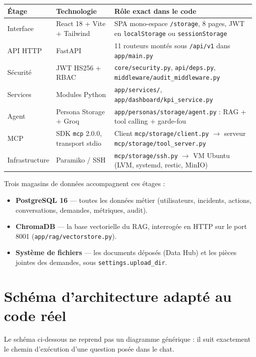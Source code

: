 \documentclass[11pt,a4paper]{report}
\newcommand{\file}[1]{\texttt{\small #1}}
\newcommand{\route}[1]{\texttt{\small\textcolor{oasisgreen}{#1}}}
\newcommand{\arrowto}{\ensuremath{\rightarrow}}
\begin{document}
\begin{longtable}{@{}p{2.6cm}p{4.3cm}p{7.6cm}@{}}
\toprule
\textbf{Étage} & \textbf{Technologie} & \textbf{Rôle exact dans le code}\\
\midrule
\endhead
Interface & React 18 + Vite + Tailwind & SPA mono-espace \file{/storage}, 8 pages, JWT en \texttt{localStorage} ou \texttt{sessionStorage}\\
API HTTP & FastAPI & 11 routeurs montés sous \route{/api/v1} dans \file{app/main.py}\\
Sécurité & JWT HS256 + RBAC & \file{core/security.py}, \file{api/deps.py}, \file{middleware/audit\_middleware.py}\\
Services & Modules Python & \file{app/services/}, \file{app/dashboard/kpi\_service.py}\\
Agent & Persona Storage + Groq & \file{app/personas/storage/agent.py} : RAG + tool calling + garde-fou\\
MCP & SDK \texttt{mcp} 2.0.0, transport stdio & Client \file{mcp/storage/client.py} \arrowto{} serveur \file{mcp/storage/tool\_server.py}\\
Infrastructure & Paramiko / SSH & \file{mcp/storage/ssh.py} \arrowto{} VM Ubuntu (LVM, systemd, restic, MinIO)\\
\bottomrule
\end{longtable}

\noindent
Trois magasins de données accompagnent ces étages :

\begin{itemize}
  \item \textbf{PostgreSQL 16} --- toutes les données métier (utilisateurs,
  incidents, actions, conversations, demandes, métriques, audit).
  \item \textbf{ChromaDB} --- la base vectorielle du RAG, interrogée en HTTP sur
  le port 8001 (\file{app/rag/vectorstore.py}).
  \item \textbf{Système de fichiers} --- les documents déposés (Data Hub) et les
  pièces jointes des demandes, sous \file{settings.upload\_dir}.
\end{itemize}

\section{Schéma d'architecture adapté au code réel}

Le schéma ci-dessous ne reprend pas un diagramme générique : il suit exactement
le chemin d'exécution d'une question posée dans le chat.
\end{document}
